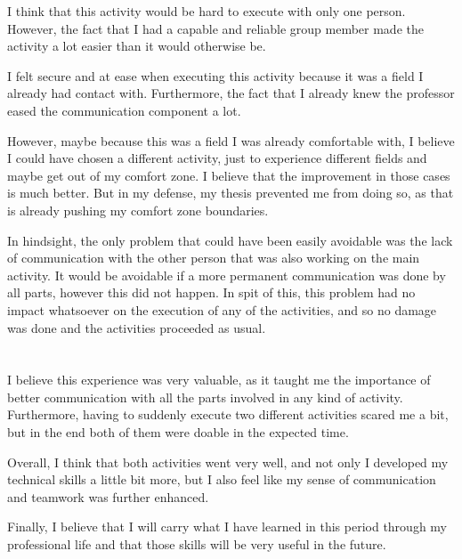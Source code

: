 \documentclass[a4paper,12pt,journal,twoside,compsoc]{PPIEEEtran}
\begin{document}
I think that this activity would be hard to execute with only one person. However, the fact that I had a capable and reliable group member made the activity a lot easier than it would otherwise be.

I felt secure and at ease when executing this activity because it was a field I already had contact with. Furthermore, the fact that I already knew the professor eased the communication component a lot.

However, maybe because this was a field I was already comfortable with, I believe I could have chosen a different activity, just to experience different fields and maybe get out of my comfort zone. I believe that the improvement in those cases is much better. But in my defense, my thesis prevented me from doing so, as that is already pushing my comfort zone boundaries.

In hindsight, the only problem that could have been easily avoidable was the lack of communication with the other person that was also working on the main activity. It would be avoidable if a more permanent communication was done by all parts, however this did not happen. In spit of this, this problem had no impact whatsoever on the execution of any of the activities, and so no damage was done and the activities proceeded as usual.

\section{}
\label{concl}

I believe this experience was very valuable, as it taught me the importance of better communication with all the parts involved in any kind of activity. Furthermore, having to suddenly execute two different activities scared me a bit, but in the end both of them were doable in the expected time.

Overall, I think that both activities went very well, and not only I developed my technical skills a little bit more, but I also feel like my sense of communication and teamwork was further enhanced.

Finally, I believe that I will carry what I have learned in this period through my professional life and that those skills will be very useful in the future.


\ifCLASSOPTIONcompsoc
\end{document}
